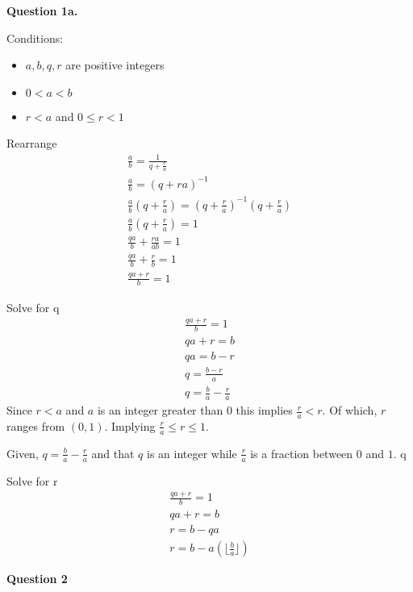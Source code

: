 \documentclass{article}
\begin{document}
\textbf{Question 1a.}

Conditions:
\begin{itemize}
    \item $a,b,q,r$ are positive integers
    \item $0<a<b$
    \item $r<a$ and $0 \leq r < 1$
\end{itemize}

Rearrange
\begin{align*}
    \frac{a}{b} = \frac{1}{q + \frac{r}{a}}\\
    \frac{a}{b} = (q+{r}{a})^{-1} \\
    \frac{a}{b}(q+\frac{r}{a}) = (q+\frac{r}{a})^{-1}(q+\frac{r}{a}) \\
    \frac{a}{b}(q+\frac{r}{a}) = 1 \\
    \frac{qa}{b} + \frac{ra}{ab} = 1 \\
    \frac{qa}{b} + \frac{r}{b} = 1 \\
    \frac{qa+r}{b} = 1
\end{align*}

Solve for q
\begin{align*}
    \frac{qa+r}{b}=1 \\
    qa+r = b \\
    qa = b-r \\
    q = \frac{b-r}{a} \\
    q = \frac{b}{a} - \frac{r}{a}
\end{align*}
Since $r<a$ %
and $a$ is an integer greater than $0$
this implies $\frac{r}{a} < r$. Of which, $r$ ranges from $(0,1)$. 
Implying $\frac{r}{a} \le r \le 1$.

Given, $q=\frac{b}{a} - \frac{r}{a}$ and that $q$ is an integer while 
$\frac{r}{a}$ is a fraction between $0$ and $1$. q 

Solve for r
\begin{align*}
    \frac{qa+r}{b} = 1 \\
    qa+r = b \\
    r = b-qa \\
    r = b -  a(\lfloor \frac{b}{a} \rfloor)
\end{align*}

\textbf{Question 2}

\begin{algorithm}
\end{algorithm}
\end{document}
